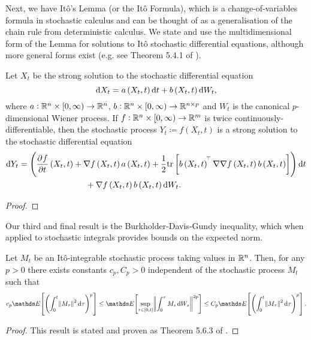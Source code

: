 Next, we have It\^o's Lemma (or the It\^o Formula), which is a change-of-variables formula in stochastic calculus and can be thought of as a generalisation of the chain rule from deterministic calculus.
We state and use the multidimensional form of the Lemma for solutions to It\^o stochastic differential equations, although more general forms exist (e.g. see Theorem 5.4.1 of \citet{KallianpurSundar_2014_StochasticAnalysisDiffusion}).

\begin{theorem}[It\^o's Lemma]\label{thm:ito_lemma}
	Let \(X_t\) be the strong solution to the stochastic differential equation
	\[
		\dif X_t = a\left(X_t, t\right)\dif t + b\left(X_t, t\right)\dif W_t,
	\]
	where \(a: \mathbb{R}^n \times [0,\infty) \to \mathbb{R}^n\), \(b: \mathbb{R}^n \times [0,\infty) \to \mathbb{R}^{n\times p}\) and \(W_t\) is the canonical \(p\)-dimensional Wiener process.
	If \(f: \mathbb{R}^n \times [0, \infty) \to \mathbb{R}^m\) is twice continuously-differentiable, then the stochastic process \(Y_t \coloneqq f\left(X_t, t\right)\) is a strong solution to the stochastic differential equation
	\begin{align*}
		\dif Y_t & = \left(\dpd{f}{t}\left(X_t, t\right) + \nabla f\left(X_t, t\right) a\left(X_t, t\right) + \frac12\mathrm{tr}\left[b\left(X_t, t\right)^{\T} \nabla\nabla f\left(X_t, t\right) b\left(X_t, t\right)\right] \right)\dif t \\
		         & \qquad\qquad\qquad\qquad + \nabla f\left(X_t, t\right)b\left(X_t, t\right) \dif W_t.
	\end{align*}
\end{theorem}

\begin{proof}

\end{proof}

Our third and final result is the Burkholder-Davis-Gundy inequality, which when applied to stochastic integrals provides bounds on the expected norm.

\begin{theorem}\label{thm:bdg}
	Let \(M_t\) be an It\^o-integrable stochastic process taking values in \(\mathbb{R}^n\).
	Then, for any \(p > 0\) there exists constants \(c_p, C_p > 0\) independent of the stochastic process \(M_t\) such that
	\[
		c_p\avg{\left(\int_0^t{\norm{M_\tau}^2\dif \tau}\right)^p} \leq \avg{\sup_{\tau \in \left[0, t\right]}\norm{\int_0^\tau{M_s\dif W_s}}^{2p}} \leq C_p\avg{\left(\int_0^t{\norm{M_\tau}^2\dif \tau}\right)^p}.
	\]
\end{theorem}
\begin{proof}
	This result is stated and proven as Theorem 5.6.3 of \citet{KallianpurSundar_2014_StochasticAnalysisDiffusion}.
\end{proof}

